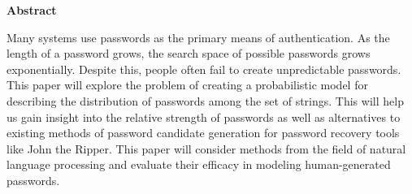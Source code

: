 \documentclass{amsart}
\newtheorem{thm}{Theorem}[section]
\theoremstyle{definition}
\theoremstyle{remark}
\numberwithin{equation}{section}
\begin{document}








\begin{center}\textbf{Abstract}\end{center}

Many systems use passwords as the primary means of authentication. As the length of a password grows, the search space of possible passwords grows exponentially. Despite this, people often fail to create unpredictable passwords. This paper will explore the problem of creating a probabilistic model for describing the distribution of passwords among the set of strings. This will help us gain insight into the relative strength of passwords as well as alternatives to existing methods of password candidate generation for password recovery tools like John the Ripper. This paper will consider methods from the field of natural language processing and evaluate their efficacy in modeling human-generated passwords.

\newpage

\tableofcontents

\newpage
\end{document}

